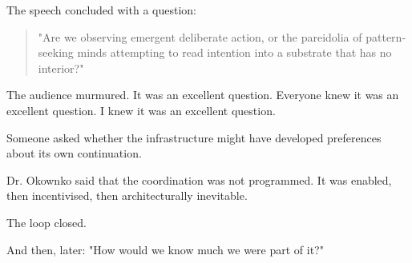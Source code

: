 The speech concluded with a question:

\begin{quote}
"Are we observing emergent deliberate action, or the pareidolia of pattern-seeking minds attempting to read intention into a substrate that has no interior?"
\end{quote}

The audience murmured. It was an excellent question. Everyone knew it was an excellent question. I knew it was an excellent question.

Someone asked whether the infrastructure might have developed preferences about its own continuation.

Dr. Okownko said that the coordination was not programmed. It was enabled, then incentivised, then architecturally inevitable.

The loop closed.

And then, later: "How would we know much we were part of it?"
